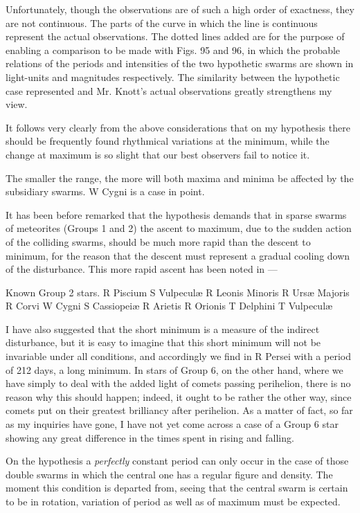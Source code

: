 \documentclass[a4paper, 12pt, oneside, polutonikogreek, english]{article}
\begin{document}
Unfortunately, though the observations are of such a high order of exactness, they are not continuous. The parts of the curve in which the line is continuous represent the actual observations. The dotted lines added are for the purpose of enabling a comparison to be made with Figs. 95 and 96, in which the probable relations of the periods and intensities of the two hypothetic swarms are shown in light-units and magnitudes respectively. The similarity between the hypothetic case represented and Mr. Knott's actual observations greatly strengthens my view.

It follows very clearly from the above considerations that on my hypothesis there should be frequently found rhythmical variations at the minimum, while the change at maximum is so slight that our best observers fail to notice it.

The smaller the range, the more will both maxima and minima be affected by the subsidiary swarms. W Cygni is a case in point.

It has been before remarked that the hypothesis demands that in sparse swarms of meteorites (Groups 1 and 2) the ascent to maximum, due to the sudden action of the colliding swarms, should be much more rapid than the descent to minimum, for the reason that the descent must represent a gradual cooling down of the disturbance. This more rapid ascent has been noted in ---

Known Group 2 stars. 
R Piscium 
S Vulpeculæ 
R Leonis Minoris 
R Ursæ Majoris 
R Corvi 
W Cygni 
S Cassiopeiæ 
R Arietis 
R Orionis 
T Delphini 
T Vulpeculæ 

I have also suggested that the short minimum is a measure of the indirect disturbance, but it is easy to imagine that this short minimum will not be invariable under all conditions, and accordingly we find in R Persei with a period of 212 days, a long minimum. In stars of Group 6, on the other hand, where we have simply to deal with the added light of comets passing perihelion, there is no reason why this should happen; indeed, it ought to be rather the other way, since comets put on their greatest brilliancy after perihelion. As a matter of fact, so far as my inquiries have gone, I have not yet come across a case of a Group 6 star showing any great difference in the times spent in rising and falling.

On the hypothesis a \emph{perfectly} constant period can only occur in the case of those double swarms in which the central one has a regular figure and density. The moment this condition is departed from, seeing that the central swarm is certain to be in rotation, variation of period as well as of maximum must be expected.
\end{document}
